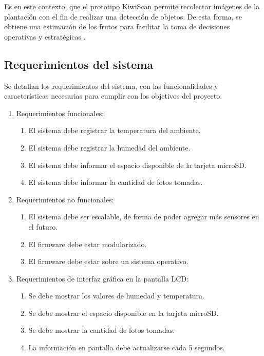 Es en este contexto, que el prototipo KiwiScan permite recolectar imágenes de la plantación con el fin de realizar una detección de objetos. De esta forma, se obtiene una estimación de los frutos para facilitar la toma de decisiones operativas y estratégicas \citep{Mendoza2021}.

\subsection{Requerimientos del sistema}

Se detallan los requerimientos del sistema, con las funcionalidades y características necesarias para cumplir con los objetivos del proyecto.

\begin{enumerate}
	\item Requerimientos funcionales:
		\begin{enumerate}
			\item El sistema debe registrar la temperatura del ambiente.
			\item El sistema debe registrar la humedad del ambiente.
			\item El sistema debe informar el espacio disponible de la tarjeta microSD.
            \item El sistema debe informar la cantidad de fotos tomadas.
		\end{enumerate}
	\item Requerimientos no funcionales:
		\begin{enumerate}
			\item El sistema debe ser escalable, de forma de poder agregar más sensores en el futuro.
			\item El firmware debe estar modularizado.
            \item El firmware debe estar sobre un sistema operativo.
		\end{enumerate}
    \item Requerimientos de interfaz gráfica en la pantalla LCD:
		\begin{enumerate}
			\item Se debe mostrar los valores de humedad y temperatura.
			\item Se debe mostrar el espacio disponible en la tarjeta microSD.
            \item Se debe mostrar la cantidad de fotos tomadas.
            \item La información en pantalla debe actualizarse cada 5 segundos.
		\end{enumerate}

\end{enumerate}
